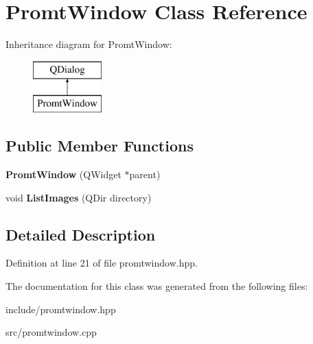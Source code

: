 \hypertarget{classPromtWindow}{}\section{Promt\+Window Class Reference}
\label{classPromtWindow}
Inheritance diagram for Promt\+Window\+:\begin{figure}[H]
\begin{center}
\leavevmode
\includegraphics[height=2.000000cm]{classPromtWindow}
\end{center}
\end{figure}
\subsection*{Public Member Functions}
\begin{DoxyCompactItemize}
\item 
\mbox{\label{classPromtWindow_a6536787a099e6d7348db00b4382244a8}} 
{\bfseries Promt\+Window} (Q\+Widget $\ast$parent)
\item 
\mbox{\label{classPromtWindow_a9f2e84ed19a4f520e0e764c31cc39362}} 
void {\bfseries List\+Images} (Q\+Dir directory)
\end{DoxyCompactItemize}


\subsection{Detailed Description}


Definition at line 21 of file promtwindow.\+hpp.



The documentation for this class was generated from the following files\+:\begin{DoxyCompactItemize}
\item 
include/promtwindow.\+hpp\item 
src/promtwindow.\+cpp\end{DoxyCompactItemize}
